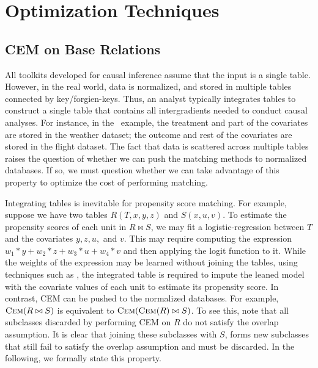 
\section{Optimization Techniques}
\label{sec:OptimizationTechniques}



\subsection{CEM on Base Relations}
\label{sec:baserel}

All toolkits developed for causal inference
assume that the input is a single table. However, in the real world, data is normalized, and stored in multiple tables
connected by key/forgien-keys. Thus, an analyst typically integrates tables
to construct a single table that contains all intergradients needed to conduct causal analyses. For instance, in  the \delay \ example, the treatment and part of the covariates
are stored in the weather dataset; the outcome and  rest of the covariates are stored in the
flight dataset. The fact that  data is scattered across multiple tables raises the question of whether we
can  push the matching methods to normalized databases. If so, we must question  whether we can take advantage of this property
to optimize the cost of  performing matching.


Integrating tables is inevitable for propensity score matching. For example, suppose we have two tables
$R(T,x,y,z)$ and $S(x,u,v)$. To estimate the propensity scores of each unit in $R \bowtie S$, we may fit
a logistic-regression between $T$ and  the covariates $y,z,u,$ and $v$. This may require computing the expression $w_1*y + w_2*z + w_3*u + w_4*v$ and then applying the logit function to it.  While the weights of the expression may be learned without joining the tables, using techniques such as \cite{schleich2016learning}, the integrated table is required to impute the leaned model with the covariate values of each unit to estimate its propensity score. In contrast,  CEM can be pushed
to the normalized databases. For example, ${\textsc{Cem}}(R \bowtie S)$ is equivalent to ${\textsc{Cem}}({\textsc{Cem}}(R)\bowtie S)$. To see this, note that all subclasses discarded by performing CEM on $R$ do not satisfy the overlap assumption. It is clear that joining these subclasses with $S$, forms new subclasses that still fail to satisfy the overlap assumption and must be discarded. In the following, we formally state this property.







